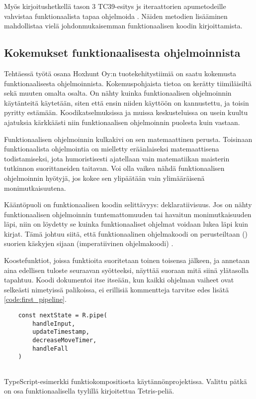 Myös kirjoitushetkellä tason 3 TC39-esitys \gls{js} iteraattorien apumetodeille vahvistaa funktionaalista tapaa ohjelmoida \cite{tc39_iterator_helpers}. Näiden metodien lisääminen mahdollistaa vielä johdonmukaisemman funktionaalisen koodin kirjoittamista.

\subsection{Kokemukset funktionaalisesta ohjelmoinnista}


Tehtäessä työtä osana Hoxhunt Oy:n tuotekehitystiimiä on saatu kokemusta funktionaalisesta ohjelmoinnista. Kokemuspohjaista tietoa on kerätty tiimiläisiltä sekä muuten omalta osalta. On nähty kuinka funktionaalisen ohjelmoinnin käytänteitä käytetään, siten että ensin niiden käyttöön on kannustettu, ja toisin pyritty estämään. Koodikatselmuksissa ja muissa keskusteluissa on usein kuultu ajatuksia kärkkäästi niin funktionaalisen ohjelmoinnin puolesta kuin vastaan.

Funktionaalisen ohjelmoinnin kulkakivi on sen matemaattinen perusta. Toisinaan funktionaalista ohjelmointia on mielletty eräänlaiseksi matemaattisena todistamiseksi, jota humoristisesti ajatellaan vain matematiikan maisterin tutkinnon suorittaneiden taitavan. Voi olla vaikea nähdä funktionaalisen ohjelmoinnin hyötyjä, jos kokee sen ylipäätään vain ylimääräisenä monimutkaisuutena.

Kääntöpuoli on funktionaalisen koodin selittävyys: deklaratiivisuus. Jos on nähty funktionaalisen ohjelmoinnin tuntemattomuuden tai havaitun monimutkaisuuden läpi, niin on löydetty se kuinka funktionaaliset ohjelmat voidaan lukea läpi kuin kirjat. Tämä johtuu siitä, että funktionaalinen ohjelmakoodi on perusteiltaan () suorien käskyjen sijaan (imperatiivinen ohjelmakoodi) \cite{ms:fp_vs_imperative}.

Koostefunktiot, joissa funktioita suoritetaan toinen toisensa jälkeen, ja annetaan aina edellisen tuloste seuraavan syötteeksi, näyttää suoraan mitä siinä ylätasolla tapahtuu. Koodi dokumentoi itse itseään, kun kaikki ohjelman vaiheet ovat selkeästi nimetyissä palikoissa, ei erillisiä kommentteja tarvitse edes lisätä \ref{code:first_pipeline}.

\begin{code}
    \begin{verbatim}
    const nextState = R.pipe(
        handleInput,
        updateTimestamp,
        decreaseMoveTimer,
        handleFall
    )
    
\end{verbatim}
    \caption{TypeScript-esimerkki funktiokompositiosta käytännönprojektissa. Valittu pätkä on osa funktionaalisella tyylillä kirjoitettua Tetris-peliä.}
    \label{code:first_pipeline}
\end{code}


